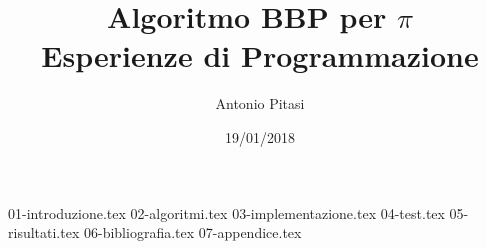 \documentclass[11pt]{article}
\title{Algoritmo BBP per $\pi$ \\
\large Esperienze di Programmazione
}
\author{Antonio Pitasi}
\date{19/01/2018}
\begin{document}

\maketitle

{01-introduzione.tex}
{02-algoritmi.tex}
{03-implementazione.tex}
{04-test.tex}
{05-risultati.tex}
{06-bibliografia.tex}
{07-appendice.tex}
\end{document}
